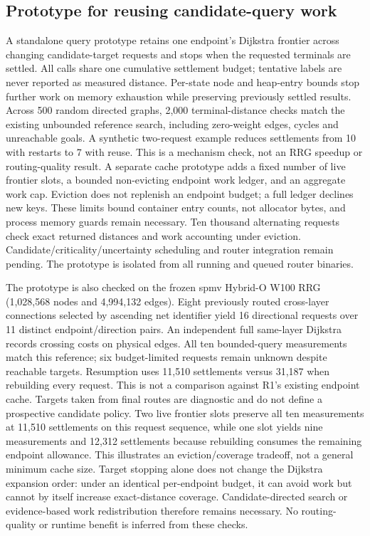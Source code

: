 \documentclass[conference,10pt]{IEEEtran}
\begin{document}
\subsection{Prototype for reusing candidate-query work}
A standalone query prototype retains one endpoint's Dijkstra frontier across changing candidate-target requests and stops when the requested terminals are settled. All calls share one cumulative settlement budget; tentative labels are never reported as measured distance. Per-state node and heap-entry bounds stop further work on memory exhaustion while preserving previously settled results. Across 500 random directed graphs, 2,000 terminal-distance checks match the existing unbounded reference search, including zero-weight edges, cycles and unreachable goals. A synthetic two-request example reduces settlements from 10 with restarts to 7 with reuse. This is a mechanism check, not an RRG speedup or routing-quality result. A separate cache prototype adds a fixed number of live frontier slots, a bounded non-evicting endpoint work ledger, and an aggregate work cap. Eviction does not replenish an endpoint budget; a full ledger declines new keys. These limits bound container entry counts, not allocator bytes, and process memory guards remain necessary. Ten thousand alternating requests check exact returned distances and work accounting under eviction. Candidate/criticality/uncertainty scheduling and router integration remain pending. The prototype is isolated from all running and queued router binaries.

The prototype is also checked on the frozen spmv Hybrid-O W100 RRG (1,028,568 nodes and 4,994,132 edges). Eight previously routed cross-layer connections selected by ascending net identifier yield 16 directional requests over 11 distinct endpoint/direction pairs. An independent full same-layer Dijkstra records crossing costs on physical edges. All ten bounded-query measurements match this reference; six budget-limited requests remain unknown despite reachable targets. Resumption uses 11,510 settlements versus 31,187 when rebuilding every request. This is not a comparison against R1's existing endpoint cache. Targets taken from final routes are diagnostic and do not define a prospective candidate policy. Two live frontier slots preserve all ten measurements at 11,510 settlements on this request sequence, while one slot yields nine measurements and 12,312 settlements because rebuilding consumes the remaining endpoint allowance. This illustrates an eviction/coverage tradeoff, not a general minimum cache size. Target stopping alone does not change the Dijkstra expansion order: under an identical per-endpoint budget, it can avoid work but cannot by itself increase exact-distance coverage. Candidate-directed search or evidence-based work redistribution therefore remains necessary. No routing-quality or runtime benefit is inferred from these checks.
\end{document}
